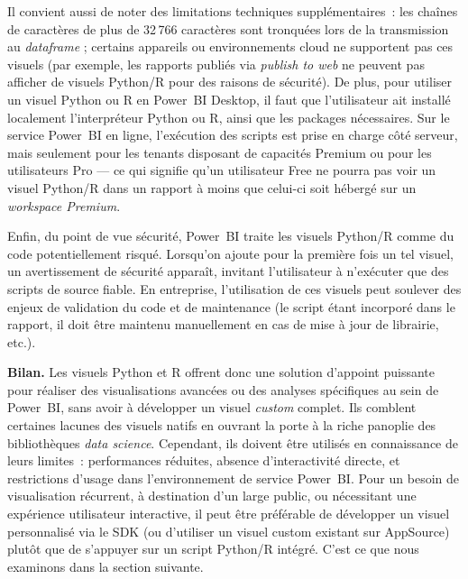 Il convient aussi de noter des limitations techniques supplémentaires~: les chaînes de caractères de plus de 32\,766 caractères sont tronquées lors de la transmission au \textit{dataframe}\parencite{MicrosoftPythonRVisualsDocs2024} ;  
certains appareils ou environnements cloud ne supportent pas ces visuels (par exemple, les rapports publiés via \textit{publish to web} ne peuvent pas afficher de visuels Python/R pour des raisons de sécurité)\parencite{MicrosoftPythonRVisualsDocs2024}.  
De plus, pour utiliser un visuel Python ou R en Power~BI Desktop, il faut que l’utilisateur ait installé localement l’interpréteur Python ou R, ainsi que les packages nécessaires.  
Sur le service Power~BI en ligne, l’exécution des scripts est prise en charge côté serveur, mais seulement pour les tenants disposant de capacités Premium ou pour les utilisateurs Pro — ce qui signifie qu’un utilisateur Free ne pourra pas voir un visuel Python/R dans un rapport à moins que celui-ci soit hébergé sur un \textit{workspace Premium}\parencite{MicrosoftPythonRVisualsDocs2024}.

Enfin, du point de vue sécurité, Power~BI traite les visuels Python/R comme du code potentiellement risqué.  
Lorsqu’on ajoute pour la première fois un tel visuel, un avertissement de sécurité apparaît, invitant l’utilisateur à n’exécuter que des scripts de source fiable\parencite{MicrosoftPythonRVisualsDocs2024}.  
En entreprise, l’utilisation de ces visuels peut soulever des enjeux de validation du code et de maintenance (le script étant incorporé dans le rapport, il doit être maintenu manuellement en cas de mise à jour de librairie, etc.).

\textbf{Bilan.}  
Les visuels Python et R offrent donc une solution d’appoint puissante pour réaliser des visualisations avancées ou des analyses spécifiques au sein de Power~BI, sans avoir à développer un visuel \textit{custom} complet.  
Ils comblent certaines lacunes des visuels natifs en ouvrant la porte à la riche panoplie des bibliothèques \textit{data science}.  
Cependant, ils doivent être utilisés en connaissance de leurs limites~: performances réduites, absence d’interactivité directe, et restrictions d’usage dans l’environnement de service Power~BI.  
Pour un besoin de visualisation récurrent, à destination d’un large public, ou nécessitant une expérience utilisateur interactive, il peut être préférable de développer un visuel personnalisé via le SDK (ou d’utiliser un visuel custom existant sur AppSource) plutôt que de s’appuyer sur un script Python/R intégré.  
C’est ce que nous examinons dans la section suivante.
